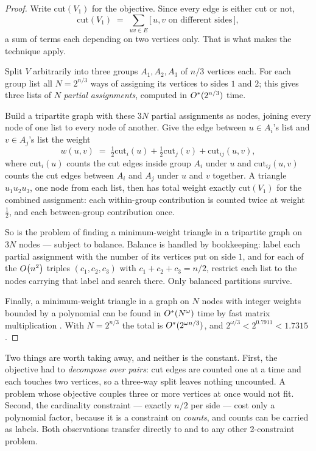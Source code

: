 \begin{proof}
Write $\mathrm{cut}(V_1)$ for the objective. Since every edge is either cut or
not,
\[ \mathrm{cut}(V_1) \;=\; \sum_{uv \in E}
   \bigl[\, u,v \text{ on different sides} \,\bigr], \]
a sum of terms each depending on two vertices only. That is what makes the
technique apply.

Split $V$ arbitrarily into three groups $A_1, A_2, A_3$ of $n/3$ vertices each.
For each group list all $N = 2^{n/3}$ ways of assigning its vertices to sides
$1$ and $2$; this gives three lists of $N$ \emph{partial assignments}, computed
in $O^{*}(2^{n/3})$ time.

Build a tripartite graph with these $3N$ partial assignments as nodes, joining
every node of one list to every node of another. Give the edge between
$u \in A_i$'s list and $v \in A_j$'s list the weight
\[ w(u,v) \;=\; \tfrac12 \mathrm{cut}_i(u) + \tfrac12 \mathrm{cut}_j(v)
   + \mathrm{cut}_{ij}(u,v), \]
where $\mathrm{cut}_i(u)$ counts the cut edges inside group $A_i$ under $u$ and
$\mathrm{cut}_{ij}(u,v)$ counts the cut edges between $A_i$ and $A_j$ under $u$
and $v$ together. A triangle $u_1u_2u_3$, one node from each list, then has
total weight exactly $\mathrm{cut}(V_1)$ for the combined assignment: each
within-group contribution is counted twice at weight $\tfrac12$, and each
between-group contribution once.

So  is the problem of finding a minimum-weight triangle in
a tripartite graph on $3N$ nodes --- subject to balance. Balance is handled by
bookkeeping: label each partial assignment with the number of its vertices put
on side $1$, and for each of the $O\!\left(n^2\right)$ triples $(c_1,c_2,c_3)$ with
$c_1 + c_2 + c_3 = n/2$, restrict each list to the nodes carrying that label and
search there. Only balanced partitions survive.

Finally, a minimum-weight triangle in a graph on $N$ nodes with integer weights
bounded by a polynomial can be found in $O^{*}(N^{\omega})$ time by fast matrix
multiplication \citep{Williams2005}. With $N = 2^{n/3}$ the total is
$O^{*}(2^{\omega n /3})$, and $2^{\omega/3} < 2^{0.7911} < 1.7315$.
\end{proof}

\begin{intuition}
Two things are worth taking away, and neither is the constant. First, the
objective had to \emph{decompose over pairs}: cut edges are counted one at a
time and each touches two vertices, so a three-way split leaves nothing
uncounted. A problem whose objective couples three or more vertices at once
would not fit. Second, the cardinality constraint --- exactly $n/2$ per side ---
cost only a polynomial factor, because it is a constraint on \emph{counts},
and counts can be carried as labels. Both observations transfer directly to
 and to any other 2-constraint problem.
\end{intuition}

